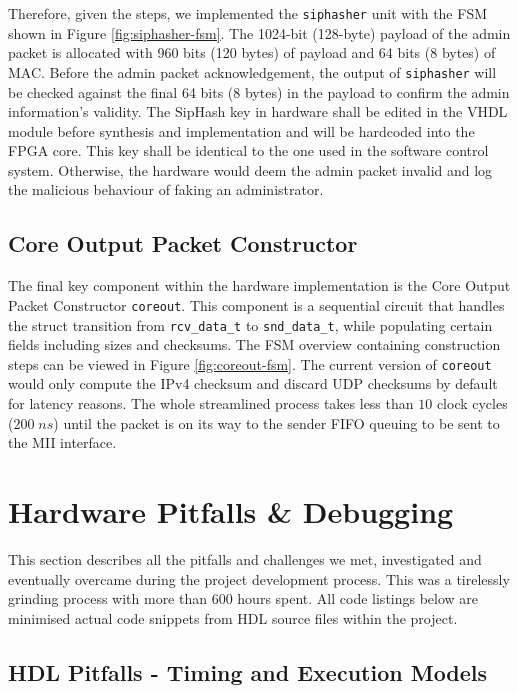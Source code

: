 \documentclass[a4paper]{report}
\newcommand{\proglang}{\textsf}
\newcommand{\code}{\texttt}
\begin{document}
Therefore, given the steps, we implemented the \code{siphasher} unit with the FSM shown in Figure \ref{fig:siphasher-fsm}. The 1024-bit (128-byte) payload of the admin packet is allocated with 960 bits (120 bytes) of payload and 64 bits (8 bytes) of MAC. Before the admin packet acknowledgement, the output of \code{siphasher} will be checked against the final 64 bits (8 bytes) in the payload to confirm the admin information's validity. The SipHash key in hardware shall be edited in the \proglang{VHDL} module before synthesis and implementation and will be hardcoded into the FPGA core. This key shall be identical to the one used in the software control system. Otherwise, the hardware would deem the admin packet invalid and log the malicious behaviour of faking an administrator.

\subsection{Core Output Packet Constructor}

The final key component within the hardware implementation is the Core Output Packet Constructor \code{coreout}. This component is a sequential circuit that handles the struct transition from \code{rcv\_data\_t} to \code{snd\_data\_t}, while populating certain fields including sizes and checksums. The FSM overview containing construction steps can be viewed in Figure \ref{fig:coreout-fsm}. The current version of \code{coreout} would only compute the IPv4 checksum and discard UDP checksums by default for latency reasons. The whole streamlined process takes less than $10$ clock cycles ($200\; ns$) until the packet is on its way to the sender FIFO queuing to be sent to the MII interface.


\section{Hardware Pitfalls \& Debugging}
\label{section:implementation-hardware-debugging}

This section describes all the pitfalls and challenges we met, investigated and eventually overcame during the project development process. This was a tirelessly grinding process with more than 600 hours spent. All code listings below are minimised actual code snippets from HDL source files within the project. 

\subsection{HDL Pitfalls - Timing and Execution Models}
\end{document}
